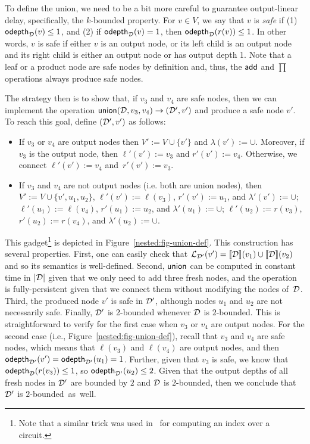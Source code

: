 To define the union, we need to be a bit more careful to guarantee output-linear delay, specifically, the  $k$-bounded property.
For $v\in V$, we say that $v$ is {\em safe} if (1) $\mathsf{odepth}_{\mathcal{D}}(v) \leq 1$, and (2) if $\mathsf{odepth}_{\mathcal{D}}(v) = 1$, then $\mathsf{odepth}_{\mathcal{D}}(r(v)) \leq 1$. In other words, $v$ is safe if either $v$ is an output node, or its left child is an output node and its right child is either an output node or has output depth 1.
Note that a leaf or a product node are safe nodes by definition and, thus, the $\mathsf{add}$ and $\prod$ operations always produce safe nodes. 

The strategy then is to show that, if $v_3$ and $v_4$ are safe nodes, then we can implement the operation $\mathsf{union}(\mathcal{D},v_3, v_4) \rightarrow (\mathcal{D}',v')$ and produce a safe node $v'$. To reach this goal, define $(\mathcal{D}',v')$ as follows:
\begin{itemize}
	\item  If $v_3$ or $v_4$ are output nodes then $V' := V\cup\{v'\}$ and $\lambda(v') := \cup$. Moreover, if $v_3$ is the output node, then $\ell'(v') := v_3$ and $r'(v') := v_4$. Otherwise, we connect $\ell'(v') := v_4$ and~$r'(v') := v_3$.
	\item If $v_3$ and $v_4$ are not output nodes (i.e. both are union nodes), then $V' := V \cup\{v',u_1,u_2\}$, $\ell'(v') := \ell(v_3)$, $r'(v') := u_1$, and $\lambda'(v') := \cup$; $\ell'(u_1) := \ell(v_4)$, $r'(u_1) := u_2$, and $\lambda'(u_1) := \cup$; $\ell'(u_2) := r(v_3)$, $r'(u_2) := r(v_4)$, and $\lambda'(u_2) := \cup$.
\end{itemize}
This gadget\footnote{Note that a similar trick was used in~\cite{AmarilliBJM17} for computing an index over a circuit.} is depicted in Figure~\ref{nested:fig-union-def}. %
This construction has several properties.
First, one can easily check that $\mathcal{L}_{\mathcal{D}'}(v') = {\llbracket{\mathcal{D}}\rrbracket}(v_1)\cup{\llbracket{\mathcal{D}}\rrbracket}(v_2)$ and so its semantics is well-defined. 
Second, $\mathsf{union}$ can be computed in constant time in $|\mathcal{D}|$ given that we only need to add three fresh nodes, and the operation is fully-persistent given that we connect them without modifying the nodes of~$\mathcal{D}$. 
Third, the produced node $v'$ is safe in $\mathcal{D}'$, although nodes $u_1$ and $u_2$ are not necessarily safe. 
Finally, $\mathcal{D}'$ is 2-bounded whenever $\mathcal{D}$ is $2$-bounded. This is straightforward to verify for the first case when $v_3$ or $v_4$ are output nodes. For the second case (i.e., Figure~\ref{nested:fig-union-def}), recall that $v_3$ and $v_4$ are safe nodes, which means that $\ell(v_3)$ and $\ell(v_4)$ are output nodes, and then $\mathsf{odepth}_{\mathcal{D}'}(v') = \mathsf{odepth}_{\mathcal{D}'}(u_1) = 1$. Further, given that $v_3$ is safe, we know that $\mathsf{odepth}_{\mathcal{D}}(r(v_3)) \leq 1$, so $\mathsf{odepth}_{\mathcal{D}'}(u_2)\leq 2$. Given that the output depths of all fresh nodes in $\mathcal{D}'$ are bounded by $2$ and $\mathcal{D}$ is $2$-bounded, then we conclude that $\mathcal{D}'$ is $2$-bounded~as~well.

